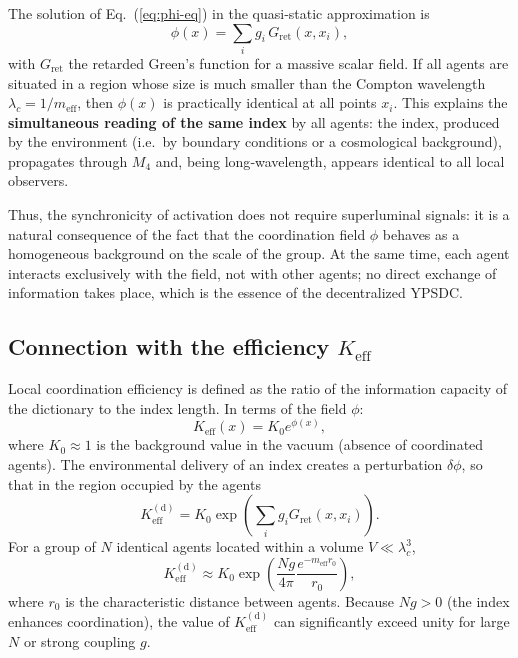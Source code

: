 \documentclass[12pt,a4paper]{article}
\begin{document}
	The solution of Eq.~(\ref{eq:phi-eq}) in the quasi‑static approximation is
	\begin{equation}
		\phi(x) = \sum_i g_i \, G_{\mathrm{ret}}(x, x_i),
	\end{equation}
	with \(G_{\mathrm{ret}}\) the retarded Green’s function for a massive scalar field. If all agents are situated in a region whose size is much smaller than the Compton wavelength \(\lambda_c = 1/m_{\mathrm{eff}}\), then \(\phi(x)\) is practically identical at all points \(x_i\). This explains the \textbf{simultaneous reading of the same index} by all agents: the index, produced by the environment (i.e.\ by boundary conditions or a cosmological background), propagates through \(M_4\) and, being long‑wavelength, appears identical to all local observers.
	
	Thus, the synchronicity of activation does not require superluminal signals: it is a natural consequence of the fact that the coordination field \(\phi\) behaves as a homogeneous background on the scale of the group. At the same time, each agent interacts exclusively with the field, not with other agents; no direct exchange of information takes place, which is the essence of the decentralized YPSDC.
	
	\subsection{Connection with the efficiency \(K_{\mathrm{eff}}\)}
	
	Local coordination efficiency is defined as the ratio of the information capacity of the dictionary to the index length. In terms of the field \(\phi\):
	\begin{equation}
		K_{\mathrm{eff}}(x) = K_0 e^{\phi(x)},
		\label{eq:Keff-field}
	\end{equation}
	where \(K_0 \approx 1\) is the background value in the vacuum (absence of coordinated agents). The environmental delivery of an index creates a perturbation \(\delta\phi\), so that in the region occupied by the agents
	\begin{equation}
		K_{\mathrm{eff}}^{\mathrm{(d)}} = K_0 \exp\!\left( \sum_i g_i G_{\mathrm{ret}}(x, x_i) \right).
	\end{equation}
	For a group of \(N\) identical agents located within a volume \(V \ll \lambda_c^3\),
	\begin{equation}
		K_{\mathrm{eff}}^{\mathrm{(d)}} \approx K_0 \exp\!\left( \frac{N g}{4\pi} \frac{e^{-m_{\mathrm{eff}} r_0}}{r_0} \right),
	\end{equation}
	where \(r_0\) is the characteristic distance between agents. Because \(N g > 0\) (the index enhances coordination), the value of \(K_{\mathrm{eff}}^{\mathrm{(d)}}\) can significantly exceed unity for large \(N\) or strong coupling \(g\).
	
\end{document}

